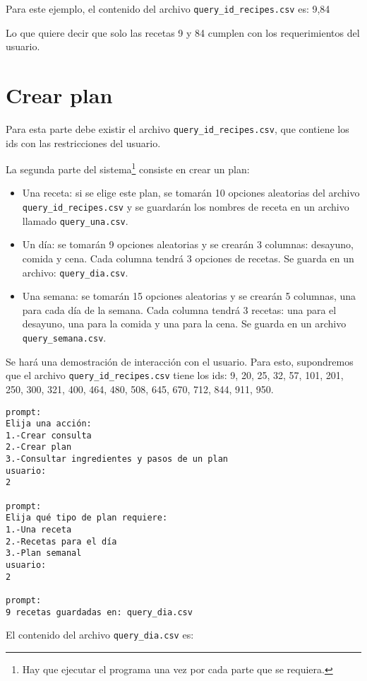 \documentclass{article}
\begin{document}
Para este ejemplo, el contenido del archivo \texttt{query\_id\_recipes.csv} es: 9,84

Lo que quiere decir que solo las recetas 9 y 84 cumplen con los requerimientos del usuario.

\section{Crear plan}

Para esta parte debe existir el archivo \texttt{query\_id\_recipes.csv}, que contiene los ids con las restricciones del usuario.

La segunda parte del sistema\footnote{Hay que ejecutar el programa una vez por cada parte que se requiera.} consiste en crear un plan:

\begin{itemize}
\item Una receta: si se elige este plan, se tomarán 10 opciones aleatorias del archivo \texttt{query\_id\_recipes.csv} y se guardarán los nombres de receta en un archivo llamado \texttt{query\_una.csv}.
\item Un día: se tomarán 9 opciones aleatorias y se crearán 3 columnas: desayuno, comida y cena. Cada columna tendrá 3 opciones de recetas. Se guarda en un archivo: \texttt{query\_dia.csv}.
\item Una semana: se tomarán 15 opciones aleatorias y se crearán 5 columnas, una para cada día de la semana. Cada columna tendrá 3 recetas: una para el desayuno, una para la comida y una para la cena. Se guarda en un archivo \texttt{query\_semana.csv}.
\end{itemize}

Se hará una demostración de interacción con el usuario. Para esto, supondremos que el archivo \texttt{query\_id\_recipes.csv} tiene los ids: 9, 20, 25, 32, 57, 101, 201, 250, 300, 321, 400, 464, 480, 508, 645, 670, 712, 844, 911, 950.

\begin{verbatim}
prompt:
Elija una acción:
1.-Crear consulta
2.-Crear plan
3.-Consultar ingredientes y pasos de un plan
usuario:
2

prompt:
Elija qué tipo de plan requiere:
1.-Una receta
2.-Recetas para el día
3.-Plan semanal
usuario:
2

prompt:
9 recetas guardadas en: query_dia.csv
\end{verbatim}

El contenido del archivo \texttt{query\_dia.csv} es:
\end{document}
